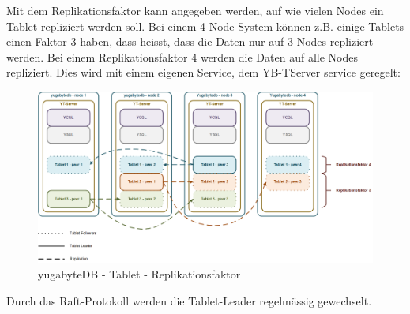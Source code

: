 \begin{flushleft}
    Mit dem Replikationsfaktor  kann angegeben werden, auf wie vielen Nodes ein Tablet repliziert werden soll.
    Bei einem 4-Node System können z.B. einige Tablets einen Faktor 3 haben, dass heisst, dass die Daten nur auf 3 Nodes repliziert werden.
    Bei einem Replikationsfaktor 4 werden die Daten auf alle Nodes repliziert.
    Dies wird mit einem eigenen Service, dem YB-TServer service \cite{RSV64WED} geregelt:
    \begin{figure}[H]
        \centering
        \includegraphics[width=0.8\linewidth]{source/implementation/evaluation/postgresql_ha_solutions/yugabytedb/yugabytedb-tablet-replication-factor}
        \caption{yugabyteDB - Tablet - Replikationsfaktor}
        \label{fig:yugabytedb-tablet-replication-factor}
    \end{figure}
\end{flushleft}
\begin{flushleft}
    Durch das Raft-Protokoll werden die Tablet-Leader regelmässig gewechselt.
    \end{flushleft}
